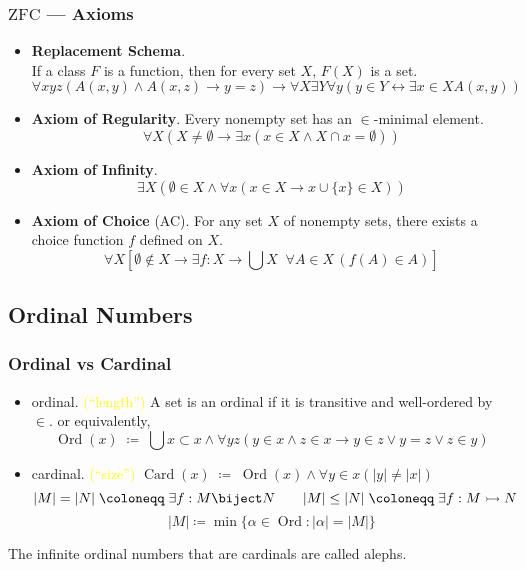 \documentclass[UTF8,aspectratio=43,11pt,colorlinks,compress,openany]{beamer}%
\begin{document}
\begin{frame}\frametitle{$\mathrm{ZFC}$ --- Axioms}
	\begin{itemize}
		\item \textbf{Replacement Schema}.\\
		If a class $F$ is a function, then for every set $X$, $F(X)$ is a set.
		\[\forall xyz(A(x,y)\wedge A(x,z)\to y=z)\to\forall X\exists Y\forall y(y\in Y\leftrightarrow\exists x\in X A(x,y))\]
		\item \textbf{Axiom of Regularity}. Every nonempty set has an $\in$-minimal element.
		\[\forall X(X\neq\emptyset\to\exists x(x\in X\wedge X\cap x=\emptyset))\]
		\item \textbf{Axiom of Infinity}.
		\[\exists X(\emptyset\in X\wedge\forall x(x\in X\to x\cup\{x\}\in X))\]
		\item \textbf{Axiom of Choice} (AC). For any set $X$ of nonempty sets, there exists a choice function $f$ defined on $X$.
		\[\forall X\left[\emptyset\notin X\to\exists f: X\to\bigcup X\;\; \forall A\in X\,(f(A)\in A)\right]\]
	\end{itemize}
\end{frame}

\subsection{Ordinal Numbers}

\begin{frame}\frametitle{Ordinal vs Cardinal}
	\begin{itemize}
		\item ordinal. \textcolor{yellow}{(``length'')} A set is an ordinal if it is transitive and well-ordered by $\in$. or equivalently,
		\[\operatorname{Ord}(x)\;\coloneqq \;\bigcup x\subset x\wedge\forall yz(y\in x\wedge z\in x\to y\in z\vee y=z\vee z\in y)\]
		\item cardinal. \textcolor{yellow}{(``size'')}\quad
		$\operatorname{Card}(x)\;\coloneqq \;\operatorname{Ord}(x)\wedge\forall y\in x(|y|\neq|x|)$
		\[|M|=|N|\;\coloneqq \;\exists f: M\biject N\qquad |M|\leq|N|\;\coloneqq \;\exists f: M\rightarrowtail N\]
		\[|M|\coloneqq \min\{\alpha\in \operatorname{Ord}: |\alpha|=|M|\}\]
	\end{itemize}
	The infinite ordinal numbers that are cardinals are called alephs.
\end{frame}
\end{document}
